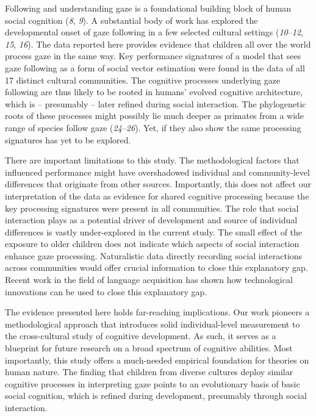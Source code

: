 \documentclass[
  man,floatsintext]{apa6}
\begin{document}
Following and understanding gaze is a foundational building block of human social cognition (\emph{8}, \emph{9}). A substantial body of work has explored the developmental onset of gaze following in a few selected cultural settings (\emph{10}--\emph{12}, \emph{15}, \emph{16}). The data reported here provides evidence that children all over the world process gaze in the same way. Key performance signatures of a model that sees gaze following as a form of social vector estimation were found in the data of all 17 distinct cultural communities. The cognitive processes underlying gaze following are thus likely to be rooted in humans' evolved cognitive architecture, which is -- presumably -- later refined during social interaction. The phylogenetic roots of these processes might possibly lie much deeper as primates from a wide range of species follow gaze (\emph{24}--\emph{26}). Yet, if they also show the same processing signatures has yet to be explored.

There are important limitations to this study. The methodological factors that influenced performance might have overshadowed individual and community-level differences that originate from other sources. Importantly, this does not affect our interpretation of the data as evidence for shared cognitive processing because the key processing signatures were present in all communities. The role that social interaction plays as a potential driver of development and source of individual differences is vastly under-explored in the current study. The small effect of the exposure to older children does not indicate which aspects of social interaction enhance gaze processing. Naturalistic data directly recording social interactions across communities would offer crucial information to close this explanatory gap. Recent work in the field of language acquisition has shown how technological innovations can be used to close this explanatory gap.

The evidence presented here holds far-reaching implications. Our work pioneers a methodological approach that introduces solid individual-level measurement to the cross-cultural study of cognitive development. As such, it serves as a blueprint for future research on a broad spectrum of cognitive abilities. Most importantly, this study offers a much-needed empirical foundation for theories on human nature. The finding that children from diverse cultures deploy similar cognitive processes in interpreting gaze points to an evolutionary basis of basic social cognition, which is refined during development, presumably through social interaction.
\end{document}
